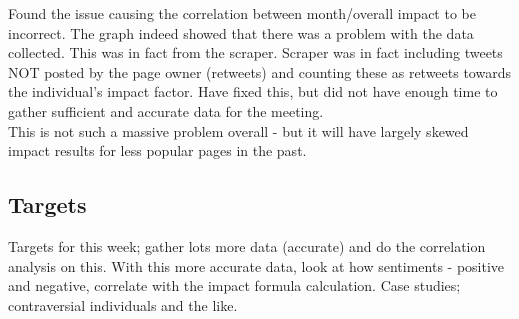 Found the issue causing the correlation between month/overall impact to be incorrect. The graph indeed showed that there was a problem with the data collected. This was in fact from the scraper. Scraper was in fact including tweets NOT posted by the page owner (retweets) and counting these as retweets towards the individual's impact factor. Have fixed this, but did not have enough time to gather sufficient and accurate data for the meeting.\\

\noindent This is not such a massive problem overall - but it will have largely skewed impact results for less popular pages in the past.

\subsection{Targets}

Targets for this week; gather lots more data (accurate) and do the correlation analysis on this. With this more accurate data, look at how sentiments - positive and negative, correlate with the impact formula calculation. Case studies; contraversial individuals and the like. 
